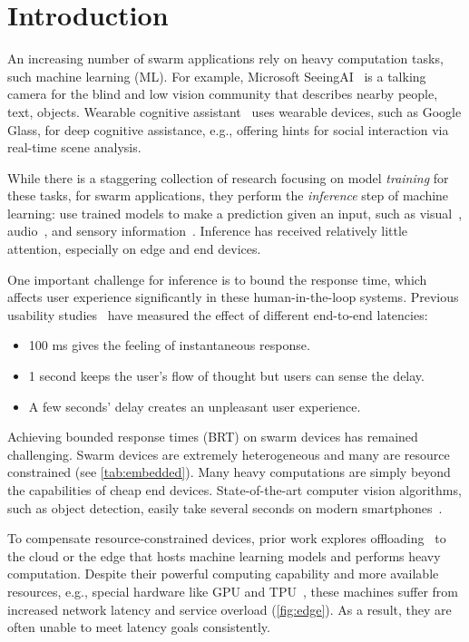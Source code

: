\section{Introduction}
\label{sec:introduction}

An increasing number of swarm applications rely on heavy computation tasks, such
machine learning (ML). For example, Microsoft SeeingAI~\cite{seeingai} is a
talking camera for the blind and low vision community that describes nearby
people, text, objects. Wearable cognitive assistant~\cite{ha2014towards} uses
wearable devices, such as Google Glass, for deep cognitive assistance, e.g.,
offering hints for social interaction via real-time scene analysis.

While there is a staggering collection of research focusing on model
\textit{training} for these tasks, for swarm applications, they perform the
\textit{inference} step of machine learning: use trained models to make a
prediction given an input, such as visual~\cite{googlelens, ha2014towards,
  seeingai}, audio~\cite{alexa, applesiri, cortana}, and sensory
information~\cite{laput2017synthetic, lu2010jigsaw}. Inference has received
relatively little attention, especially on edge and end devices.

One important challenge for inference is to bound the response time, which
affects user experience significantly in these human-in-the-loop
systems. Previous usability studies~\cite{nielsen1994usability,
  schneiderman1998designing} have measured the effect of different end-to-end
latencies:

\begin{itemize}[noitemsep, topsep=0pt]
\item 100 ms gives the feeling of instantaneous response.
\item 1 second keeps the user's flow of thought but users can sense the delay.
\item A few seconds' delay creates an unpleasant user experience.
\end{itemize}

Achieving bounded response times (BRT) on swarm devices has remained
challenging. Swarm devices are extremely heterogeneous and many are resource
constrained (see \autoref{tab:embedded}). Many heavy computations are simply
beyond the capabilities of cheap end devices. State-of-the-art computer vision
algorithms, such as object detection, easily take several seconds on modern
smartphones~\cite{chen2015glimpse}.

To compensate resource-constrained devices, prior work explores
offloading~\cite{chun2011clonecloud,cuervo2010maui} to the cloud or the edge
that hosts machine learning models and performs heavy computation. Despite their
powerful computing capability and more available resources, e.g., special
hardware like GPU and TPU~\cite{jouppi2017datacenter}, these machines suffer
from increased network latency and service overload (\autoref{fig:edge}). As a
result, they are often unable to meet latency goals consistently.

